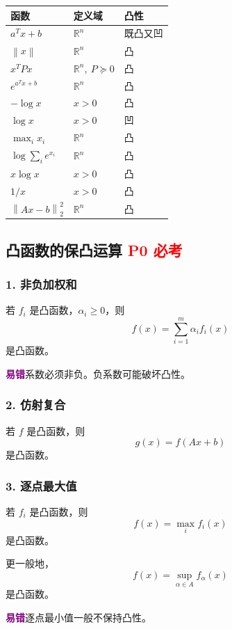 \documentclass[11pt,a4paper]{ctexart}
\newcommand{\R}{\mathbb{R}}
\newcommand{\norm}[1]{\left\lVert #1 \right\rVert}
\newcommand{\Pzero}{\textcolor{red}{\textbf{P0 必考}}}
\newcommand{\warn}{\textcolor{purple}{\textbf{易错}}}
\theoremstyle{definition}
\theoremstyle{plain}
\theoremstyle{remark}
\begin{document}
\begin{center}
\begin{tabular}{lll}
\toprule
函数 & 定义域 & 凸性 \\
\midrule
$a^Tx+b$ & $\R^n$ & 既凸又凹 \\
$\norm{x}$ & $\R^n$ & 凸 \\
$x^TPx$ & $\R^n,\ P\succeq0$ & 凸 \\
$e^{a^Tx+b}$ & $\R^n$ & 凸 \\
$-\log x$ & $x>0$ & 凸 \\
$\log x$ & $x>0$ & 凹 \\
$\max_i x_i$ & $\R^n$ & 凸 \\
$\log\sum_i e^{x_i}$ & $\R^n$ & 凸 \\
$x\log x$ & $x>0$ & 凸 \\
$1/x$ & $x>0$ & 凸 \\
$\norm{Ax-b}_2^2$ & $\R^n$ & 凸 \\
\bottomrule
\end{tabular}
\end{center}

\subsection{凸函数的保凸运算 \Pzero}

\subsubsection*{1. 非负加权和}

若 $f_i$ 是凸函数，$\alpha_i\ge0$，则
\[
    f(x)=\sum_{i=1}^m \alpha_i f_i(x)
\]
是凸函数。

\warn{系数必须非负。负系数可能破坏凸性。}

\subsubsection*{2. 仿射复合}

若 $f$ 是凸函数，则
\[
    g(x)=f(Ax+b)
\]
是凸函数。

\subsubsection*{3. 逐点最大值}

若 $f_i$ 是凸函数，则
\[
    f(x)=\max_i f_i(x)
\]
是凸函数。

更一般地，
\[
    f(x)=\sup_{\alpha\in A} f_\alpha(x)
\]
是凸函数。

\warn{逐点最小值一般不保持凸性。}
\end{document}
